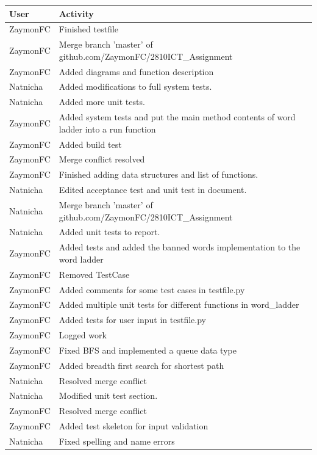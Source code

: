 \documentclass[12pt, a4]{report}
\begin{document}
		\begin{tabular}{ | p{2cm} | p{13cm} | }
			\hline
				User & Activity \\
			\hline
			ZaymonFC & Finished testfile \\ 
			ZaymonFC & Merge branch 'master' of github.com/ZaymonFC/2810ICT\_Assignment \\ 
			ZaymonFC & Added diagrams and function description \\ 
			Natnicha & Added modifications to full system tests. \\ 
			Natnicha & Added more unit tests. \\ 
			ZaymonFC & Added system tests and put the main method contents of word ladder into a run function \\ 
			ZaymonFC & Added build test \\ 
			ZaymonFC & Merge conflict resolved \\ 
			ZaymonFC & Finished adding data structures and list of functions. \\ 
			Natnicha & Edited acceptance test and unit test in document. \\ 
			Natnicha & Merge branch 'master' of github.com/ZaymonFC/2810ICT\_Assignment \\ 
			Natnicha & Added unit tests to report. \\ 
			ZaymonFC & Added tests and added the banned words implementation to the word ladder \\ 
			ZaymonFC & Removed TestCase \\ 
			ZaymonFC & Added comments for some test cases in testfile.py \\ 
			ZaymonFC & Added multiple unit tests for different functions in word\_ladder \\ 
			ZaymonFC & Added tests for user input in testfile.py \\ 
			ZaymonFC & Logged work \\ 
			ZaymonFC & Fixed BFS and implemented a queue data type \\ 
			ZaymonFC & Added breadth first search for shortest path \\ 
			Natnicha & Resolved merge conflict \\ 
			Natnicha & Modified unit test section. \\ 
			ZaymonFC & Resolved merge conflict \\ 
			ZaymonFC & Added test skeleton for input validation \\ 
			Natnicha & Fixed spelling and name errors \\ 
				\hline 
			\end{tabular}
			
\end{document}

